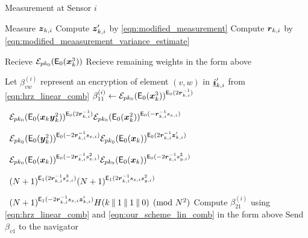\documentclass[twocolumn]{autart}
\begin{document}
\begin{algorithm}
    \caption{Measurement at Sensor $i$}\label{alg:measurement_info}
    \begin{algorithmic}[1]

        \State Measure ${\boldsymbol{z}}_{k,i}$
        \State Compute ${\boldsymbol{z}}_{k,i}'$ by \eqref{eqn:modified_measurement}
        \State Compute ${\boldsymbol{r}}_{k, i}$ by \eqref{eqn:modified_meaasurement_variance_estimate}

        \State Recieve $\mathcal{E}_{pk_0}(\mathsf{E}_{0}({\boldsymbol{x}}^3_k))$
        \State Recieve remaining weights in the form above
        \EndWhile

        \State Let $\beta_{vw}^{(i)}$ represent an encryption of element $(v,w)$ in ${\boldsymbol{\underline{i}}}'_{k,i}$ from \eqref{eqn:hrz_linear_comb}
        \State $\beta_{11}^{(i)} \gets \mathcal{E}_{pk_0}(\mathsf{E}_{0}({\boldsymbol{x}}^3_k))^{\mathsf{E}_{0}(2{\boldsymbol{r}}_{k, i}^{-1})}$\par
        \ $\mathcal{E}_{pk_0}(\mathsf{E}_{0}({\boldsymbol{x}}_k{\boldsymbol{y}}^2_k))^{\mathsf{E}_{0}(2{\boldsymbol{r}}_{k, i}^{-1})}
        \mathcal{E}_{pk_0}(\mathsf{E}_{0}({\boldsymbol{x}}^2_k))^{\mathsf{E}_{0}(-{\boldsymbol{r}}_{k, i}^{-1}s_{x,i})}$\par
        \ $\mathcal{E}_{pk_0}(\mathsf{E}_{0}({\boldsymbol{y}}^2_k))^{\mathsf{E}_{0}(-2{\boldsymbol{r}}_{k, i}^{-1}s_{x,i})}
        \mathcal{E}_{pk_0}(\mathsf{E}_{0}({\boldsymbol{x}}_k))^{\mathsf{E}_{0}(2{\boldsymbol{r}}_{k, i}^{-1}{\boldsymbol{z}}_{k,i}')}$\par
        \ $\mathcal{E}_{pk_0}(\mathsf{E}_{0}({\boldsymbol{x}}_k))^{\mathsf{E}_{0}(-2{\boldsymbol{r}}_{k, i}^{-1}s_{x,i}^2)}
        \mathcal{E}_{pk_0}(\mathsf{E}_{0}({\boldsymbol{x}}_k))^{\mathsf{E}_{0}(-2{\boldsymbol{r}}_{k, i}^{-1}s_{y,i}^2)}$\par
        \ $(N+1)^{\mathsf{E}_{1}(2{\boldsymbol{r}}_{k, i}^{-1}s_{x,i}^3)}
        (N+1)^{\mathsf{E}_{1}(2{\boldsymbol{r}}_{k, i}^{-1}s_{x,i}s_{y,i}^2)}$\par
        \ $(N+1)^{\mathsf{E}_{1}(-2{\boldsymbol{r}}_{k, i}^{-1}s_{x,i}{\boldsymbol{z}}_{k,i}')}
        H(k\mathbin\|1\mathbin\|1\mathbin\|0)\pmod{N^2}$
        \State Compute $\beta_{21}^{(i)}$ using \eqref{eqn:hrz_linear_comb} and \eqref{eqn:our_scheme_lin_comb} in the form above
            \State Send $\beta_{v1}$ to the navigator
        \EndFor


\end{algorithmic}
\end{algorithm}
\end{document}
